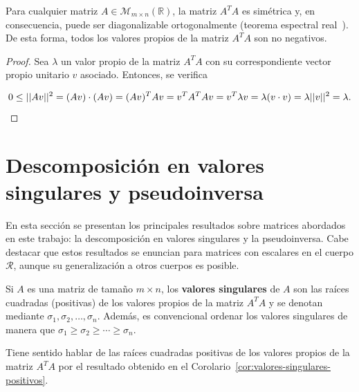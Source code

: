 \begin{corolario}\label{cor:valores-singulares-positivos}
    Para cualquier matriz $A \in \mathcal{M}_{m \times n}(\mathbb{R})$, la matriz $A^{T}A$ es simétrica y, en consecuencia, puede ser diagonalizable ortogonalmente (teorema espectral real~\cite{Blum2021}). De esta forma, todos los valores propios de la matriz $A^{T}A$ son no negativos.
\end{corolario}

\begin{proof}
    Sea $\lambda$ un valor propio de la matriz $A^{T}A$ con su correspondiente vector propio unitario $v$ asociado. Entonces, se verifica

    \[ 0 \leq ||Av||^{2} = (Av)\cdot(Av)=(Av)^{T}Av=v^{T}A^{T}Av \\ 
     = v^{T}\lambda v = \lambda (v \cdot v) = \lambda ||v||^2 = \lambda.\]\newline
\end{proof}

\section{Descomposición en valores singulares y pseudoinversa}\label{sec:svd-pseudoinversa}
En esta sección se presentan los principales resultados sobre matrices abordados en este trabajo: la descomposición en valores singulares y la pseudoinversa. Cabe destacar que estos resultados se enuncian para matrices con escalares en el cuerpo $\mathcal{R}$, aunque su generalización a otros cuerpos es posible.\newline

\begin{definicion}
    Si $A$ es una matriz de tamaño $m \times n$, los \textbf{valores singulares} de $A$ son las raíces cuadradas (positivas) de los valores propios de la matriz $A^{T}A$ y se denotan mediante $\sigma_{1}, \sigma_{2}, \ldots, \sigma_{n}$. Además, es convencional ordenar los valores singulares de manera que $\sigma_{1} \geq \sigma_{2} \geq \cdots \geq \sigma_{n}$.\newline
\end{definicion}

\begin{observacion}
    Tiene sentido hablar de las raíces cuadradas positivas de los valores propios de la matriz $A^{T}A$ por el resultado obtenido en el Corolario~\ref{cor:valores-singulares-positivos}.\newline
\end{observacion}


